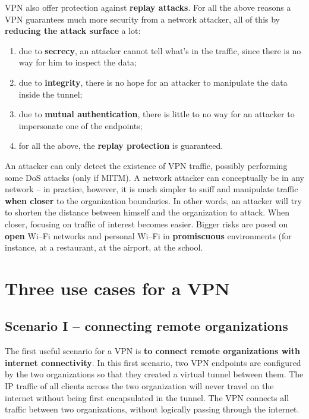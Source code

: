 \documentclass[10pt]{extbook}
\begin{document}
VPN also offer protection against \textbf{replay attacks}. For all the above
reasons a VPN guarantees much more security from a network attacker, all of
this by \textbf{reducing the attack surface} a lot:
\begin{enumerate}
    \item due to \textbf{secrecy}, an attacker cannot tell what's in the
        traffic, since there is no way for him to inspect the data;
    \item due to \textbf{integrity}, there is no hope for an attacker to
        manipulate the data inside the tunnel;
    \item due to \textbf{mutual authentication}, there is little to no way for
        an attacker to impersonate one of the endpoints;
    \item for all the above, the \textbf{replay protection} is guaranteed.
\end{enumerate}

An attacker can only detect the existence of VPN traffic, possibly performing
some DoS attacks (only if MITM). A network attacker can conceptually be in any
network -- in practice, however, it is much simpler to sniff and manipulate
traffic \textbf{when closer} to the organization boundaries. In other words, an
attacker will try to shorten the distance between himself and the organization
to attack. When closer, focusing on traffic of interest becomes easier. Bigger
risks are posed on \textbf{open} Wi--Fi networks and personal Wi--Fi in
\textbf{promiscuous} environments (for instance, at a restaurant, at the
airport, at the school.



\section{Three use cases for a VPN}
\subsection{Scenario I -- connecting remote organizations}

The first useful scenario for a VPN is \textbf{to connect remote organizations
with internet connectivity}. In this first scenario, two VPN endpoints are
configured by the two organizations so that they created a virtual tunnel
between them. The IP traffic of all clients across the two organization will
never travel on the internet without being first encapsulated in the tunnel.
The VPN connects all traffic between two organizations, without logically
passing through the internet.
\end{document}

